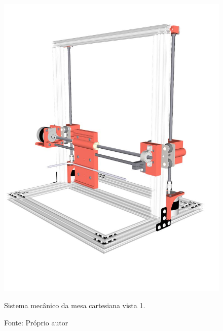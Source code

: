 \begin{figure}[H]
\centering
\includegraphics[scale = 0.45]{figuras/mesacartesiana01}
\caption{Sistema mecânico da mesa cartesiana vista 1.}
\caption*{Fonte: Próprio autor}
\label{fig:mesacartesiana01}
\end{figure}

